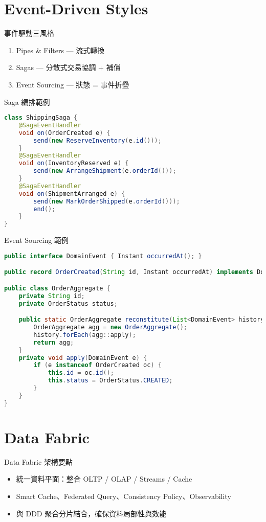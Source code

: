 \documentclass[UTF8]{beamer}
\begin{document}
\section{Event-Driven Styles}
\begin{frame}{事件驅動三風格}
    \begin{enumerate}
        \item Pipes \& Filters — 流式轉換
        \item Sagas — 分散式交易協調 + 補償
        \item Event Sourcing — 狀態 = 事件折疊
    \end{enumerate}
\end{frame}

\begin{frame}[fragile]{Saga 編排範例}
    \begin{lstlisting}[language=Java]
class ShippingSaga {
    @SagaEventHandler
    void on(OrderCreated e) {
        send(new ReserveInventory(e.id()));
    }
    @SagaEventHandler
    void on(InventoryReserved e) {
        send(new ArrangeShipment(e.orderId()));
    }
    @SagaEventHandler
    void on(ShipmentArranged e) {
        send(new MarkOrderShipped(e.orderId()));
        end();
    }
}
\end{lstlisting}
\end{frame}

\begin{frame}[fragile]{Event Sourcing 範例}
    \begin{lstlisting}[language=Java]
public interface DomainEvent { Instant occurredAt(); }

public record OrderCreated(String id, Instant occurredAt) implements DomainEvent {}

public class OrderAggregate {
    private String id;
    private OrderStatus status;

    public static OrderAggregate reconstitute(List<DomainEvent> history) {
        OrderAggregate agg = new OrderAggregate();
        history.forEach(agg::apply);
        return agg;
    }
    private void apply(DomainEvent e) {
        if (e instanceof OrderCreated oc) {
            this.id = oc.id();
            this.status = OrderStatus.CREATED;
        }
    }
}
\end{lstlisting}
\end{frame}

\section{Data Fabric}
\begin{frame}{Data Fabric 架構要點}
    \begin{itemize}
        \item 統一資料平面：整合 OLTP / OLAP / Streams / Cache
        \item Smart Cache、Federated Query、Consistency Policy、Observability
        \item 與 DDD 聚合分片結合，確保資料局部性與效能
    \end{itemize}
\end{frame}
\end{document}
